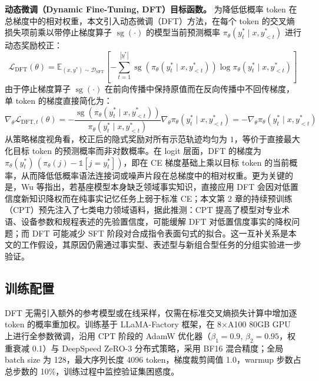\documentclass[fontset=fandol,type=master,campus=shenzhen,etitleauto=true]{hithesisbook}
\begin{document}
\textbf{动态微调（Dynamic Fine-Tuning, DFT）目标函数。} 为降低低概率 token 在总梯度中的相对权重，本文引入动态微调（DFT）方法\cite{ref82}，在每个 token 的交叉熵损失项前乘以带停止梯度算子 $\operatorname{sg}(\cdot)$ 的模型当前预测概率 $\pi_\theta(y_t^* \mid x, y_{<t}^*)$ 进行动态奖励校正：
\begin{equation}
\mathcal{L}_{\text{DFT}}(\theta) = \mathbb{E}_{(x, y^*) \sim \mathcal{D}_{\text{SFT}}} \left[ -\sum_{t=1}^{|y^*|} \operatorname{sg}\!\left(\pi_\theta(y_t^* \mid x, y_{<t}^*)\right) \log \pi_\theta(y_t^* \mid x, y_{<t}^*) \right]
\end{equation}
由于停止梯度算子 $\operatorname{sg}(\cdot)$ 在前向传播中保持原值而在反向传播中不回传梯度，单 token 的梯度直接简化为：
\begin{equation}
\nabla_\theta \mathcal{L}_{\text{DFT}, t}(\theta) = -\frac{\operatorname{sg}\!\left(\pi_\theta(y_t^* \mid x, y_{<t}^*)\right)}{\pi_\theta(y_t^* \mid x, y_{<t}^*)} \nabla_\theta \pi_\theta(y_t^* \mid x, y_{<t}^*) = -\nabla_\theta \pi_\theta(y_t^* \mid x, y_{<t}^*)
\end{equation}
从策略梯度视角看，校正后的隐式奖励对所有示范轨迹均匀为 $1$，等价于直接最大化目标 token 的预测概率而非对数概率。在 logit 层面，DFT 的梯度为 $\pi_\theta(y_t^*)\,(\pi_\theta(j) - \mathbb{1}[j = y_t^*])$，即在 CE 梯度基础上乘以目标 token 的当前概率，从而降低低概率语法连接词或噪声片段在总梯度中的相对权重。更为关键的是，Wu 等\cite{ref82}指出，若基座模型本身缺乏领域事实知识，直接应用 DFT 会因对低置信度新知识降权而在纯事实记忆任务上弱于标准 CE；本文第 2 章的持续预训练（CPT）预先注入了七类电力领域语料，据此推测：CPT 提高了模型对专业术语、设备参数和规程表述的先验置信度，可能缓解 DFT 对低置信度事实的降权问题；而 DFT 可能减少 SFT 阶段对合成指令表面句式的拟合。这一互补关系是本文的工作假设，其原因仍需通过事实型、表述型与新组合型任务的分组实验进一步验证。

\subsection{训练配置}\label{subsec:sft-config}

DFT 无需引入额外的参考模型或在线采样，仅需在标准交叉熵损失计算中增加逐 token 的概率重加权。训练基于 LLaMA-Factory 框架，在 8×A100 80GB GPU 上进行全参数微调，沿用 CPT 阶段的 AdamW 优化器（$\beta_1 = 0.9$, $\beta_2 = 0.95$，权重衰减 0.1）与 DeepSpeed ZeRO-3 分布式策略\cite{ref68,ref69}，采用 BF16 混合精度；全局 batch size 为 128，最大序列长度 4096 token，梯度裁剪阈值 1.0，warmup 步数占总步数的 10\%，训练过程中监控验证集困惑度。
\end{document}

